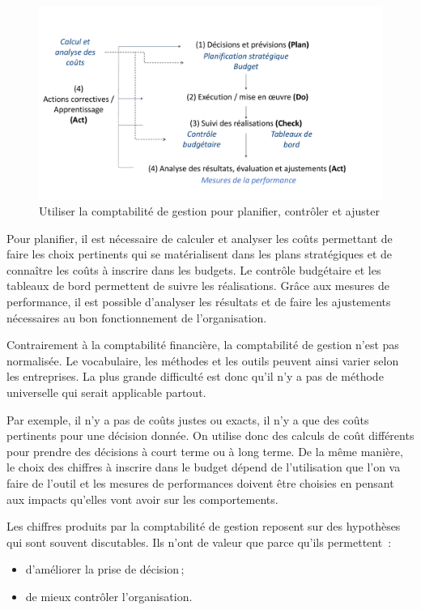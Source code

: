 \documentclass[oneside]{kaobook}
\begin{document}
\begin{figure}[H]

\includegraphics{./img/pdca.pdf}
\caption{\label{fig:org38ec58d}Utiliser la comptabilité de gestion pour planifier, contrôler et ajuster}
\end{figure}

Pour planifier, il est nécessaire de calculer et analyser les coûts permettant de faire les choix pertinents qui se matérialisent dans les plans stratégiques et de connaître les coûts à inscrire dans les budgets. Le contrôle budgétaire et les tableaux de bord permettent de suivre les réalisations. Grâce aux mesures de performance, il est possible d'analyser les résultats et de faire les ajustements nécessaires au bon fonctionnement de l'organisation.

\begin{kaobox}
Contrairement à la comptabilité financière, la comptabilité de gestion n'est pas normalisée. Le vocabulaire, les méthodes et les outils peuvent ainsi varier selon les entreprises. La plus grande difficulté est donc qu'il n'y a pas de méthode universelle qui serait applicable partout.

Par exemple, il n'y a pas de coûts justes ou exacts, il n'y a que des coûts pertinents pour une décision donnée. On utilise donc des calculs de coût différents pour prendre des décisions à court terme ou à long terme. De la même manière, le choix des chiffres à inscrire dans le budget dépend de l'utilisation que l'on va faire de l'outil et les mesures de performances doivent être choisies en pensant aux impacts qu'elles vont avoir sur les comportements. 
\end{kaobox}

Les chiffres produits par la comptabilité de gestion reposent sur des hypothèses qui sont souvent discutables. Ils n'ont de valeur que parce qu'ils permettent :
\begin{itemize}
\item d'améliorer la prise de décision ;
\item de mieux contrôler l'organisation.
\end{itemize}
\end{document}
